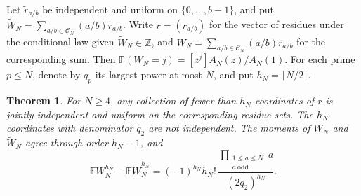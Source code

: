 \documentclass[11pt]{amsart}
\newtheorem{theorem}{Theorem}[section]
\theoremstyle{remark}
\begin{document}
Let $\widetilde r_{a/b}$ be independent and uniform on $\{0,\ldots,b-1\}$, and put $\widetilde W_N=\sum_{a/b\in\mathcal C_N}(a/b)\widetilde r_{a/b}$. Write $r=(r_{a/b})$ for the vector of residues under the conditional law given $\widetilde W_N\in\mathbb Z$, and $W_N=\sum_{a/b\in\mathcal C_N}(a/b)r_{a/b}$ for the corresponding sum. Then $\mathbb P(W_N=j)=[z^j]A_N(z)/A_N(1)$. For each prime $p\le N$, denote by $q_p$ its largest power at most $N$, and put $h_N=\lceil N/2\rceil$.

\begin{theorem}\label{thm:residue-moments}
For $N\ge4$, any collection of fewer than $h_N$ coordinates of $r$ is jointly independent and uniform on the corresponding residue sets. The $h_N$ coordinates with denominator $q_2$ are not independent. The moments of $W_N$ and $\widetilde W_N$ agree through order $h_N-1$, and
\begin{equation}\label{eq:residue-first-moment}
 \mathbb E W_N^{h_N}-\mathbb E\widetilde W_N^{h_N}
 =(-1)^{h_N}h_N!\,\frac{\displaystyle\prod_{\substack{1\le a\le N\\a\ \text{odd}}}a}{(2q_2)^{h_N}}.
\end{equation}
\end{theorem}
\end{document}

